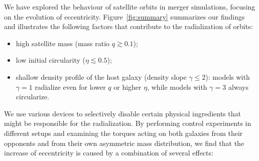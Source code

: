 \documentclass[twocolumn]{aastex63}
\begin{document}
We have explored the behaviour of satellite orbits in merger simulations, focusing on the evolution of eccentricity. Figure~\ref{fig:summary} summarizes our findings and illustrates the following factors that contribute to the radialization of orbits:
\begin{itemize}
\item high satellite mass (mass ratio $q \gtrsim 0.1$);
\item low initial circularity ($\eta \lesssim 0.5$);
\item shallow density profile of the host galaxy (density slope $\gamma\le 2$): models with $\gamma=1$ radialize even for lower $q$ or higher $\eta$, while models with $\gamma=3$ always circularize.
\end{itemize}
We use various devices to selectively disable certain physical ingredients that might be responsible for the radialization. By performing control experiments in different setups and examining the torques acting on both galaxies from their opponents and from their own asymmetric mass distribution, we find that the increase of eccentricity is caused by a combination of several effects:
\end{document}
